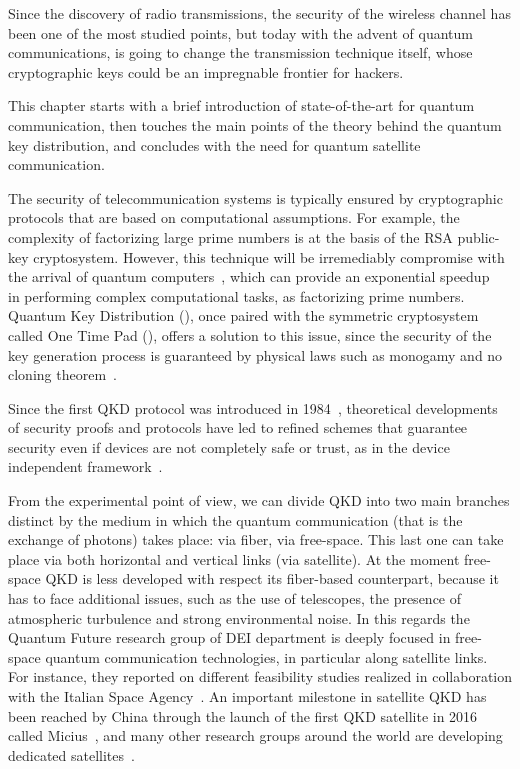 
Since the discovery of radio transmissions, the security of the wireless channel has been one of the most studied points, but today with the advent of quantum communications, is going to change the transmission technique itself, whose cryptographic keys could be an impregnable frontier for hackers.

This chapter starts with a brief introduction of state-of-the-art for quantum communication, then touches the main points of the theory behind the quantum key distribution, and concludes with the need for quantum satellite communication.


The security of telecommunication systems is typically ensured by cryptographic protocols that are based on computational assumptions. For example, the complexity of factorizing large prime numbers is at the basis of the RSA public-key cryptosystem. However, this technique will be irremediably compromise with the arrival of quantum computers~\cite{a1,a2,a3}, which can provide an exponential speedup~\cite{a4} in performing complex computational tasks, as factorizing prime numbers. Quantum Key Distribution (), once paired with the symmetric cryptosystem called One Time Pad (), offers a solution to this issue, since the security of the key generation process is guaranteed by physical laws such as monogamy and no cloning theorem~\cite{a5}.

Since the first QKD protocol was introduced in 1984~\cite{a6}, theoretical developments of security proofs and protocols have led to refined schemes that guarantee security even if devices are not completely safe or trust, as in the device independent framework~\cite{a5,a6,a7,a8,a9,a10,a11}.

From the experimental point of view, we can divide QKD into two main branches distinct by the medium in which the quantum communication (that is the exchange of photons) takes place: via fiber, via free-space. This last one can take place via both horizontal and vertical links (via satellite). At the moment free-space QKD is less developed with respect its fiber-based counterpart, because it has to face additional issues, such as the use of telescopes, the presence of atmospheric turbulence and strong environmental noise. In this regards the Quantum Future research group of DEI department is deeply focused in free-space quantum communication technologies, in particular along satellite links. For instance, they reported on different feasibility studies realized in collaboration with the Italian Space Agency~\cite{a12,a13,a14}. An important milestone in satellite QKD has been reached by China through the launch of the first QKD satellite in 2016 called Micius~\cite{a15}, and many other research groups around the world are developing dedicated satellites~\cite{a16,a17,a18}.

